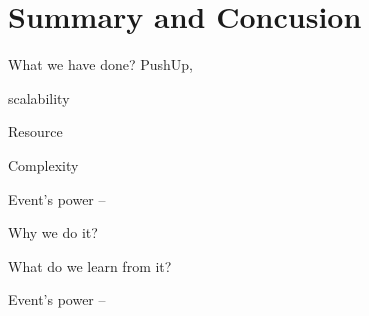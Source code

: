 \section{Summary and Concusion}

What we have done?
PushUp, 

scalability

Resource

Complexity

    Event's power -- 

Why we do it?

What do we learn from it?

Event's power -- 
